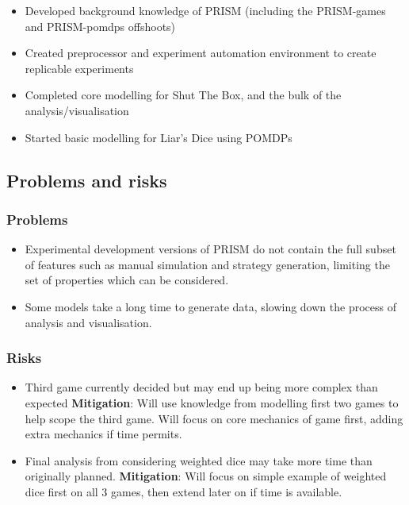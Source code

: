 \documentclass[11pt]{article}
\begin{document}
\begin{itemize}
    \item Developed background knowledge of PRISM (including the PRISM-games and PRISM-pomdps offshoots)
    \item Created preprocessor and experiment automation environment to create replicable experiments
    \item Completed core modelling for Shut The Box, and the bulk of the analysis/visualisation
    \item Started basic modelling for Liar's Dice using POMDPs
\end{itemize}

\subsection{Problems and risks}\label{problems-and-risks}

\subsubsection{Problems}\label{problems}

\begin{itemize}
\item Experimental development versions of PRISM do not contain the full subset of features such as manual simulation and strategy generation, limiting the set of properties which can be considered.
\item Some models take a long time to generate data, slowing down the process of analysis and visualisation.
\end{itemize}

\subsubsection{Risks}\label{risks}

\begin{itemize}

\item Third game currently decided but may end up being more complex than expected \textbf{Mitigation}: Will use knowledge from modelling first two games to help scope the third game. Will focus on core mechanics of game first, adding extra mechanics if time permits.
\item Final analysis from considering weighted dice may take more time than originally planned. \textbf{Mitigation}: Will focus on simple example of weighted dice first on all 3 games, then extend later on if time is available.
\end{itemize}
\end{document}
